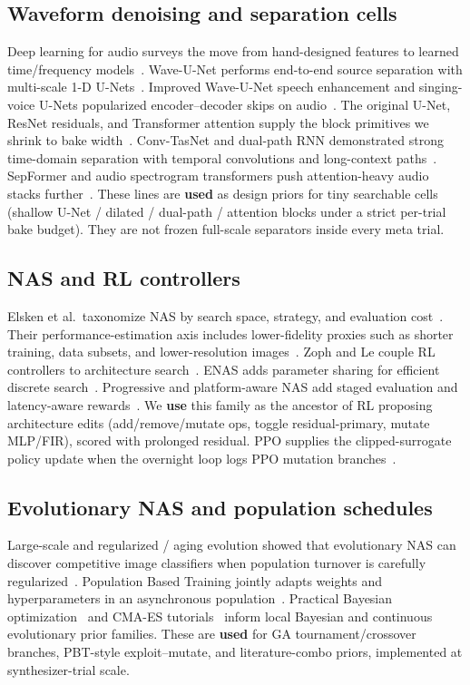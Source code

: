 \subsection{Waveform denoising and separation cells}
Deep learning for audio surveys the move from hand-designed features to learned time/frequency models~\cite{purwins2019}.
Wave-U-Net performs end-to-end source separation with multi-scale 1-D U-Nets~\cite{stoller2018}.
Improved Wave-U-Net speech enhancement and singing-voice U-Nets popularized encoder--decoder skips on audio~\cite{macartney2018,jansson2017}.
The original U-Net, ResNet residuals, and Transformer attention supply the block primitives we shrink to bake width~\cite{ronneberger2015,he2016resnet,vaswani2017}.
Conv-TasNet and dual-path RNN demonstrated strong time-domain separation with temporal convolutions and long-context paths~\cite{luo2019,luo2020dprnn}.
SepFormer and audio spectrogram transformers push attention-heavy audio stacks further~\cite{subakan2021,gong2021ast}.
These lines are \textbf{used} as design priors for tiny searchable cells (shallow U-Net / dilated / dual-path / attention blocks under a strict per-trial bake budget).
They are not frozen full-scale separators inside every meta trial.

\subsection{NAS and RL controllers}
Elsken et al.\ taxonomize NAS by search space, strategy, and evaluation cost~\cite{elsken2019}.
Their performance-estimation axis includes lower-fidelity proxies such as shorter training, data subsets, and lower-resolution images~\cite{elsken2019}.
Zoph and Le couple RL controllers to architecture search~\cite{zoph2017nas}.
ENAS adds parameter sharing for efficient discrete search~\cite{pham2018}.
Progressive and platform-aware NAS add staged evaluation and latency-aware rewards~\cite{liu2018pnas,tan2019mnasnet}.
We \textbf{use} this family as the ancestor of RL proposing architecture edits (add/remove/mutate ops, toggle residual-primary, mutate MLP/FIR), scored with prolonged residual.
PPO supplies the clipped-surrogate policy update when the overnight loop logs PPO mutation branches~\cite{schulman2017}.

\subsection{Evolutionary NAS and population schedules}
Large-scale and regularized / aging evolution showed that evolutionary NAS can discover competitive image classifiers when population turnover is carefully regularized~\cite{real2017large,real2019}.
Population Based Training jointly adapts weights and hyperparameters in an asynchronous population~\cite{jaderberg2017}.
Practical Bayesian optimization~\cite{snoek2012} and CMA-ES tutorials~\cite{hansen2016cmaes} inform local Bayesian and continuous evolutionary prior families.
These are \textbf{used} for GA tournament/crossover branches, PBT-style exploit--mutate, and literature-combo priors, implemented at synthesizer-trial scale.

